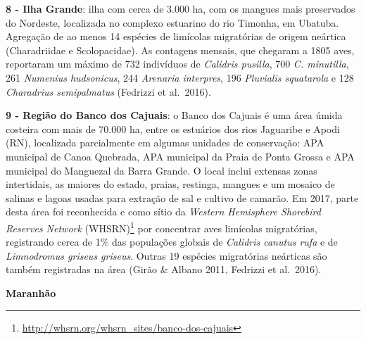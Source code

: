 \documentclass[
  oneside]{scrbook}
\DeclareRobustCommand{\href}[2]{#2\footnote{\url{#1}}}
\begin{document}
\textbf{8 - Ilha Grande}: ilha com cerca de 3.000 ha, com os mangues mais preservados do Nordeste, localizada no complexo estuarino do rio Timonha, em Ubatuba. Agregação de ao menos 14 espécies de limícolas migratórias de origem neártica (Charadriidae e Scolopacidae). As contagens mensais, que chegaram a 1805 aves, reportaram um máximo de 732 indivíduos de \emph{Calidris pusilla}, 700 \emph{C. minutilla}, 261 \emph{Numenius hudsonicus}, 244 \emph{Arenaria interpres}, 196 \emph{Pluvialis squatarola} e 128 \emph{Charadrius semipalmatus} (Fedrizzi et al.~2016).

\textbf{9 - Região do Banco dos Cajuais}: o Banco dos Cajuais é uma área úmida costeira com mais de 70.000 ha, entre os estuários dos rios Jaguaribe e Apodi (RN), localizada parcialmente em algumas unidades de conservação: APA municipal de Canoa Quebrada, APA municipal da Praia de Ponta Grossa e APA municipal do Manguezal da Barra Grande. O local inclui extensas zonas intertidais, as maiores do estado, praias, restinga, mangues e um mosaico de salinas e lagoas usadas para extração de sal e cultivo de camarão. Em 2017, parte desta área foi reconhecida e como \href{http://whsrn.org/whsrn_sites/banco-dos-cajuais}{sítio da \emph{Western Hemisphere Shorebird Reserves Network} (WHSRN)} por concentrar aves limícolas migratórias, registrando cerca de 1\% das populações globais de \emph{Calidris canutus rufa} e de \emph{Limnodromus griseus griseus}. Outras 19 espécies migratórias neárticas são também registradas na área (Girão \& Albano 2011, Fedrizzi et al.~2016).

\textbf{Maranhão}
\end{document}
